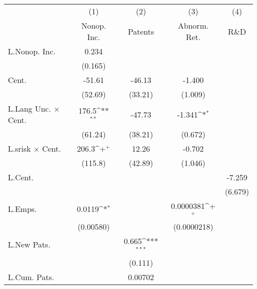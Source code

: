 {
\def\sym#1{\ifmmode^{#1}\else\(^{#1}\)\fi}
\begin{tabular}{l*{4}{c}}
\hline\hline
                    &\multicolumn{1}{c}{(1)}&\multicolumn{1}{c}{(2)}&\multicolumn{1}{c}{(3)}&\multicolumn{1}{c}{(4)}\\
                    &\multicolumn{1}{c}{Nonop. Inc.}&\multicolumn{1}{c}{Patents}&\multicolumn{1}{c}{Abnorm. Ret.}&\multicolumn{1}{c}{R\&D}\\
\hline
L.Nonop. Inc.       &       0.234         &                     &                     &                     \\
                    &     (0.165)         &                     &                     &                     \\
Cent.               &      -51.61         &      -46.13         &      -1.400         &                     \\
                    &     (52.69)         &     (33.21)         &     (1.009)         &                     \\
L.Lang Unc. $\times$ Cent.&       176.5\sym{**} &      -47.73         &      -1.341\sym{*}  &                     \\
                    &     (61.24)         &     (38.21)         &     (0.672)         &                     \\
L.srisk $\times$ Cent.&       206.3\sym{+}  &       12.26         &      -0.702         &                     \\
                    &     (115.8)         &     (42.89)         &     (1.046)         &                     \\
L.Cent.             &                     &                     &                     &      -7.259         \\
                    &                     &                     &                     &     (6.679)         \\
L.Emps.             &      0.0119\sym{*}  &                     &   0.0000381\sym{+}  &                     \\
                    &   (0.00580)         &                     & (0.0000218)         &                     \\
L.New Pats.         &                     &       0.665\sym{***}&                     &                     \\
                    &                     &     (0.111)         &                     &                     \\
L.Cum. Pats.        &                     &     0.00702         &                     &                     \\

\end{tabular}}
